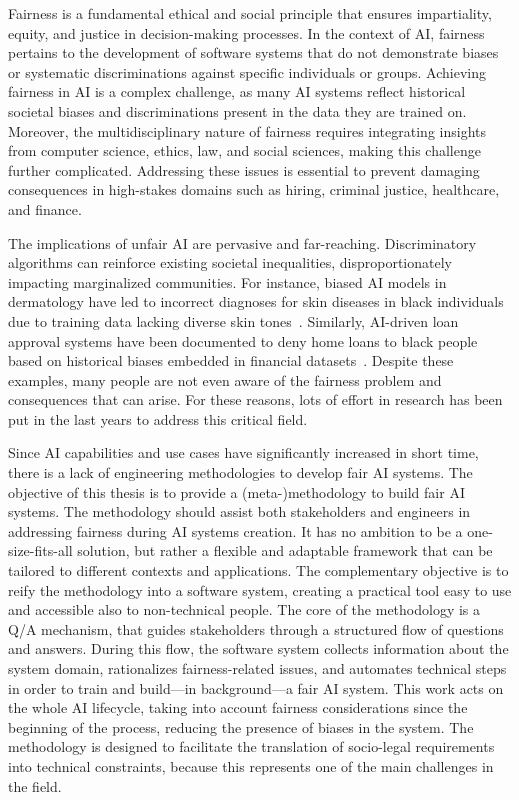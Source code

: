 \documentclass[12pt,a4paper,openright,twoside]{book}
\begin{document}
Fairness is a fundamental ethical and social principle that ensures impartiality, equity, and justice in decision-making processes.
%
In the context of \acf{AI}, fairness pertains to the development of software systems that do not demonstrate biases or systematic discriminations against specific individuals or groups.
%
Achieving fairness in \ac{AI} is a complex challenge, as many \ac{AI} systems reflect historical societal biases and discriminations present in the data they are trained on.
%
Moreover, the multidisciplinary nature of fairness requires integrating insights from computer science, ethics, law, and social sciences, making this challenge further complicated.
%
Addressing these issues is essential to prevent damaging consequences in high-stakes domains such as hiring, criminal justice, healthcare, and finance.


The implications of unfair \ac{AI} are pervasive and far-reaching.
%
Discriminatory algorithms can reinforce existing societal inequalities, disproportionately impacting marginalized communities.
%
For instance, biased AI models in dermatology have led to incorrect diagnoses for skin diseases in black individuals due to training data lacking diverse skin tones~\cite{skin-diseases}.
%
Similarly, AI-driven loan approval systems have been documented to deny home loans to black people based on historical biases embedded in financial datasets~\cite{weber2020black}.
%
Despite these examples, many people are not even aware of the fairness problem and consequences that can arise.
%
For these reasons, lots of effort in research has been put in the last years to address this critical field.

Since \ac{AI} capabilities and use cases have significantly increased in short time, there is a lack of engineering methodologies to develop fair \ac{AI} systems.
%
The objective of this thesis is to provide a (meta-)methodology to build fair \ac{AI} systems.
%
The methodology should assist both stakeholders and engineers in addressing fairness during \ac{AI} systems creation.
%
It has no ambition to be a one-size-fits-all solution, but rather a flexible and adaptable framework that can be tailored to different contexts and applications.
%
The complementary objective is to reify the methodology into a software system, creating a practical tool easy to use and accessible also to non-technical people.
%
The core of the methodology is a \acf{Q/A} mechanism, that guides stakeholders through a structured flow of questions and answers.
%
During this flow, the software system collects information about the system domain, rationalizes fairness-related issues, and automates technical steps in order to train and build---in background---a fair \ac{AI} system.
%
This work acts on the whole \ac{AI} lifecycle, taking into account fairness considerations since the beginning of the process, reducing the presence of biases in the system.
%
The methodology is designed to facilitate the translation of socio-legal requirements into technical constraints, because this represents one of the main challenges in the field.
\end{document}
